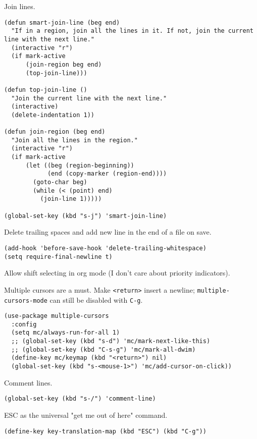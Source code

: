 \documentclass[11pt]{article}
\begin{document}
Join lines.

\begin{verbatim}
(defun smart-join-line (beg end)
  "If in a region, join all the lines in it. If not, join the current line with the next line."
  (interactive "r")
  (if mark-active
      (join-region beg end)
      (top-join-line)))

(defun top-join-line ()
  "Join the current line with the next line."
  (interactive)
  (delete-indentation 1))

(defun join-region (beg end)
  "Join all the lines in the region."
  (interactive "r")
  (if mark-active
      (let ((beg (region-beginning))
            (end (copy-marker (region-end))))
        (goto-char beg)
        (while (< (point) end)
          (join-line 1)))))

(global-set-key (kbd "s-j") 'smart-join-line)
\end{verbatim}

Delete trailing spaces and add new line in the end of a file on save.

\begin{verbatim}
(add-hook 'before-save-hook 'delete-trailing-whitespace)
(setq require-final-newline t)
\end{verbatim}

Allow shift selecting in org mode (I don't care about priority indicators).

Multiple cursors are a must. Make \texttt{<return>} insert a newline; \texttt{multiple-cursors-mode} can still be disabled with \texttt{C-g}.

\begin{verbatim}
(use-package multiple-cursors
  :config
  (setq mc/always-run-for-all 1)
  ;; (global-set-key (kbd "s-d") 'mc/mark-next-like-this)
  ;; (global-set-key (kbd "C-s-g") 'mc/mark-all-dwim)
  (define-key mc/keymap (kbd "<return>") nil)
  (global-set-key (kbd "s-<mouse-1>") 'mc/add-cursor-on-click))
\end{verbatim}

Comment lines.

\begin{verbatim}
(global-set-key (kbd "s-/") 'comment-line)
\end{verbatim}

ESC as the universal "get me out of here" command.

\begin{verbatim}
(define-key key-translation-map (kbd "ESC") (kbd "C-g"))
\end{verbatim}
\end{document}
